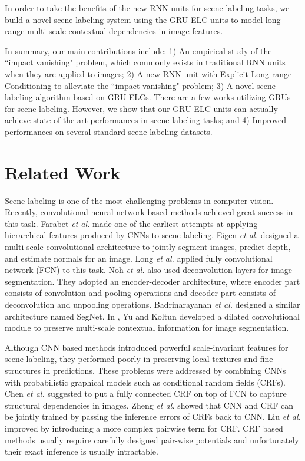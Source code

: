 \documentclass[10pt,twocolumn,letterpaper]{article}
\begin{document}
In order to take the benefits of the new RNN units for scene labeling tasks, we build a novel scene labeling system using the GRU-ELC units to model long range multi-scale contextual dependencies in image features.

In summary, our main contributions include:
1) An empirical study of the ``impact vanishing" problem, which commonly exists in traditional RNN units when they are applied to images; 
2) A new RNN unit with Explicit Long-range Conditioning to alleviate the ``impact vanishing" problem;
3) A novel scene labeling algorithm based on GRU-ELCs. There are a few works utilizing GRUs for scene labeling. However, we show that our GRU-ELC units can actually achieve state-of-the-art performances in scene labeling tasks; and
4) Improved performances on several standard scene labeling datasets.



\section{Related Work}

Scene labeling is one of the most challenging problems in computer vision. Recently, convolutional neural network based methods achieved great success in this task. Farabet \textit{et al.} \cite{1} made one of the earliest attempts at applying hierarchical features produced by CNNs to scene labeling. Eigen \textit{et al.} \cite{2} designed a multi-scale convolutional architecture to jointly segment images, predict depth, and estimate normals for an image. Long \textit{et al.} \cite{3} applied fully convolutional network (FCN) to this task. Noh \textit{et al.} \cite{4} also used deconvolution layers for image segmentation. They adopted an encoder-decoder architecture, where encoder part consists of convolution and pooling operations and decoder part consists of deconvolution and unpooling operations. Badrinarayanan \textit{et al.} \cite{5} designed a similar architecture named SegNet. In \cite{6}, Yu and Koltun developed a dilated convolutional module to preserve multi-scale contextual information for image segmentation.

Although CNN based methods introduced powerful scale-invariant features for scene labeling, they performed poorly in preserving local textures and fine structures in predictions. These problems were addressed by combining CNNs with probabilistic graphical models such as conditional random fields (CRFs). Chen \textit{et al.} \cite{7} suggested to put a fully connected CRF \cite{22} on top of FCN to capture structural dependencies in images. Zheng \textit{et al.} \cite{8} showed that CNN and CRF can be jointly trained by passing the inference errors of CRFs back to CNN. Liu \textit{et al.} \cite{9} improved \cite{8} by introducing a more complex pairwise term for CRF. CRF based methods usually require carefully designed pair-wise potentials and unfortunately their exact inference is usually intractable.
\end{document}
